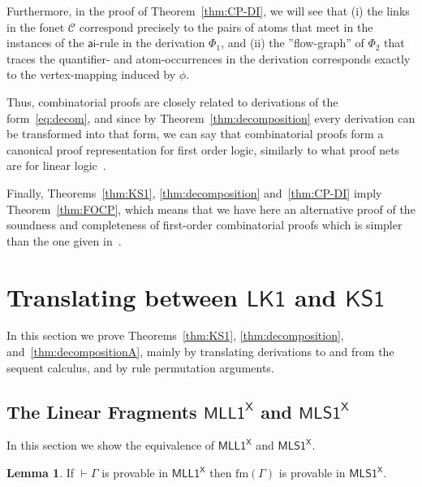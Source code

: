 \documentclass[conference,twosided,10pt]{IEEEtran}
\theoremstyle{definition}
\newtheorem{lemma}[thm]{Lemma}
\newcommand{\graph}[1]{\mathcal{#1}}
\newcommand{\gC}{\graph{C}}
\newcommand{\Deri}{\Phi}
\newcommand*{\FOLK}{\mathsf{LK1}}
\newcommand*{\FOMLL}{\mathsf{MLL1^X}}
\newcommand*{\FOKS}{\mathsf{KS1}}
\newcommand*{\FOMLS}{\mathsf{MLS1^X}}
\newcommand\aiD {\mathsf{ai}}
\newcommand{\sqn}[1]{\vdash#1}
\newcommand{\form}[1]{\mathrm{fm}(#1)}
\begin{document}
Furthermore, in the proof of Theorem~\ref{thm:CP-DI}, we will see that
(i) the links in the fonet $\gC$ correspond precisely to the pairs of
atoms that meet in the instances of the $\aiD$-rule in the derivation
$\Deri_1$, and (ii) the ''flow-graph'' of $\Deri_2$ that traces the
quantifier- and atom-occurrences in the derivation corresponds exactly
to the vertex-mapping induced by $\phi$.

Thus, combinatorial proofs are closely related to derivations of the
form~\eqref{eq:decom}, and since by Theorem~\ref{thm:decomposition}
every derivation can be transformed into that form, we can say that
combinatorial proofs form a canonical proof representation for first
order logic, similarly to what proof nets are for linear
logic~\cite{girard:96:PN}.

Finally, Theorems~\ref{thm:KS1}, \ref{thm:decomposition}
and~\ref{thm:CP-DI} imply Theorem~\ref{thm:FOCP}, which means that we
have here an alternative proof of the soundness and completeness of
first-order combinatorial proofs which is simpler than the one given
in~\cite{hughes:fopws}.




\section{Translating between $\FOLK$ and $\FOKS$}

In this section we prove Theorems~\ref{thm:KS1},
\ref{thm:decomposition}, and~\ref{thm:decompositionA}, mainly by
translating derivations to and from the sequent calculus, and by rule
permutation arguments.

\subsection{The Linear Fragments $\FOMLL$ and $\FOMLS$}

In this section we show the equivalence of $\FOMLL$ and $\FOMLS$.

\begin{lemma}\label{lem:MLL1->MLS1}
  If $\sqn\Gamma$ is provable in $\FOMLL$ then $\form\Gamma$ is provable in  $\FOMLS$.
\end{lemma}
\end{document}
